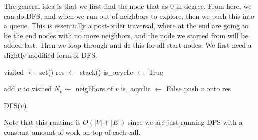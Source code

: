 \documentclass{article}
\begin{document}
    \begin{algo}
      The general idea is that we first find the node that as $0$ in-degree. From here, we can do DFS, and when we run out of neighbors to explore, then we push this into a queue. This is essentially a post-order traversal, where at the end are going to be the end nodes with no more neighbors, and the node we started from will be added last. Then we loop through and do this for all start nodes. We first need a slightly modified form of DFS. 

      \begin{algorithm}[H]
        \label{alg:iterative_top_sort}
        \begin{algorithmic}[1]
          \State visited $\gets$ set()
          \State res $\gets$ stack() 
          \State is\_acyclic $\gets$ True

              \State add $v$ to visited 
              \State $N_v \gets$ neighbors of $v$ 
                  \State is\_acyclic $\gets$ False 
                \EndIf
                \State {}
              \EndFor 
              \State push $v$ onto res
            \EndIf
          \EndFunction

          \State 

              \State DFS($v$)
            \EndFor
              \State {}
            \EndIf
            \State {}
          \EndFunction
        \end{algorithmic}
      \end{algorithm}
      Note that this runtime is $O(|V| + |E|)$ since we are just running DFS with a constant amount of work on top of each call. 
    \end{algo}
\end{document}
